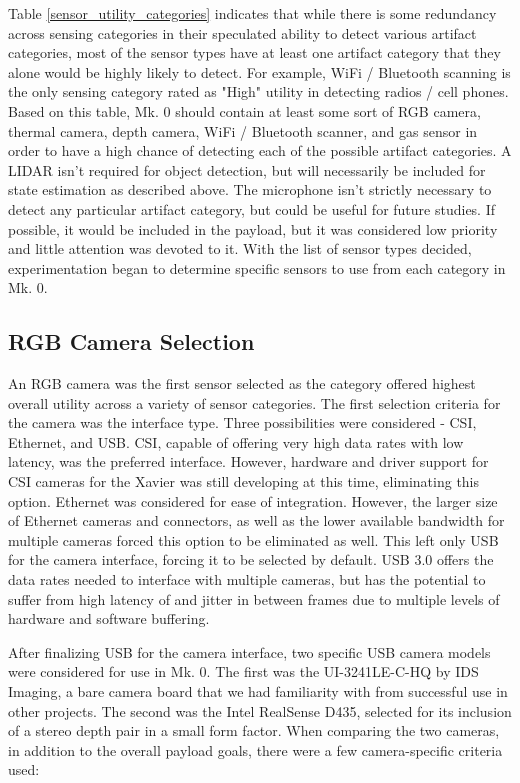 Table \ref{sensor_utility_categories} indicates that while there is some redundancy across sensing categories in their speculated ability to detect various artifact categories, most of the sensor types have at least one artifact category that they alone would be highly likely to detect. For example, WiFi / Bluetooth scanning is the only sensing category rated as "High" utility in detecting radios / cell phones. Based on this table, Mk. 0 should contain at least some sort of RGB camera, thermal camera, depth camera, WiFi / Bluetooth scanner, and gas sensor in order to have a high chance of detecting each of the possible artifact categories. A LIDAR isn't required for object detection, but will necessarily be included for state estimation as described above. The microphone isn't strictly necessary to detect any particular artifact category, but could be useful for future studies. If possible, it would be included in the payload, but it was considered low priority and little attention was devoted to it. With the list of sensor types decided, experimentation began to determine specific sensors to use from each category in Mk. 0.

\subsection{RGB Camera Selection}

An RGB camera was the first sensor selected as the category offered highest overall utility across a variety of sensor categories. The first selection criteria for the camera was the interface type. Three possibilities were considered - CSI, Ethernet, and USB. CSI, capable of offering very high data rates with low latency, was the preferred interface. However, hardware and driver support for CSI cameras for the Xavier was still developing at this time, eliminating this option. Ethernet was considered for ease of integration. However, the larger size of Ethernet cameras and connectors, as well as the lower available bandwidth for multiple cameras forced this option to be eliminated as well. This left only USB for the camera interface, forcing it to be selected by default. USB 3.0 offers the data rates needed to interface with multiple cameras, but has the potential to suffer from high latency of and jitter in between frames due to multiple levels of hardware and software buffering.

After finalizing USB for the camera interface, two specific USB camera models were considered for use in Mk. 0. The first was the UI-3241LE-C-HQ by IDS Imaging, a bare camera board that we had familiarity with from successful use in other projects. The second was the Intel RealSense D435, selected for its inclusion of a stereo depth pair in a small form factor. When comparing the two cameras, in addition to the overall payload goals, there were a few camera-specific criteria used:
	
